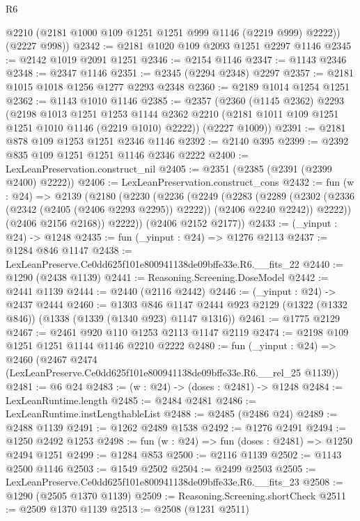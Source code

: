 \begin{lexlean}{R6}
\begin{coremodule}
        @2210
        (@2181 @1000 @109 @1251 @1251 @999 @1146 (@2219 @999) @2222))
      (@2227 @998))
@2342 := @2181 @1020 @109 @2093 @1251 @2297 @1146
@2345 := @2142 @1019 @2091 @1251
@2346 := @2154 @1146
@2347 := @1143 @2346
@2348 := @2347 @1146
@2351 := @2345 (@2294 @2348) @2297
@2357 := @2181 @1015 @1018 @1256 @1277 @2293 @2348
@2360 := @2189 @1014 @1254 @1251
@2362 := @1143 @1010 @1146
@2385 := @2357
    (@2360
      (@1145 @2362)
      @2293
      (@2198
        @1013
        @1251
        @1253
        @1144
        @2362
        @2210
        (@2181 @1011 @109 @1251 @1251 @1010 @1146 (@2219 @1010) @2222))
      (@2227 @1009))
@2391 := @2181 @878 @109 @1253 @1251 @2346 @1146
@2392 := @2140 @395
@2399 := @2392 @835 @109 @1251 @1251 @1146 @2346 @2222
@2400 := LexLeanPreservation.construct_nil
@2405 := @2351 (@2385 (@2391 (@2399 @2400) @2222))
@2406 := LexLeanPreservation.construct_cons
@2432 := fun (w : @24) =>
  @2139
    (@2180
      (@2230
        (@2236
          (@2249
            (@2283
              (@2289
                (@2302 (@2336 (@2342 (@2405 (@2406 @2293 @2295)) @2222)) (@2406 @2240 @2242))
                @2222))
            (@2406 @2156 @2168))
          @2222))
      (@2406 @2152 @2177))
@2433 := (_yinput : @24) -> @1248
@2435 := fun (_yinput : @24) => @1276 @2113
@2437 := @1284 @846 @1147
@2438 := LexLeanPreserve.Ce0dd625f101e800941138de09bffe33e.R6.__fits_22
@2440 := @1290 (@2438 @1139)
@2441 := Reasoning.Screening.DoseModel
@2442 := @2441 @1139
@2444 := @2440 (@2116 @2442)
@2446 := (_yinput : @24) -> @2437 @2444
@2460 := @1303
    @846
    @1147
    @2444
    @923
    @2129
    (@1322 (@1332 @846))
    (@1338 (@1339 (@1340 @923) @1147 @1316))
@2461 := @1775 @2129
@2467 := @2461 @920 @110 @1253 @2113 @1147 @2119
@2474 := @2198 @109 @1251 @1251 @1144 @1146 @2210 @2222
@2480 := fun (_yinput : @24) =>
  @2460 (@2467 @2474 (LexLeanPreserve.Ce0dd625f101e800941138de09bffe33e.R6.__rel_25 @1139))
@2481 := @6 @24
@2483 := (w : @24) -> (doses : @2481) -> @1248
@2484 := LexLeanRuntime.length
@2485 := @2484 @2481
@2486 := LexLeanRuntime.instLengthableList
@2488 := @2485 (@2486 @24)
@2489 := @2488 @1139
@2491 := @1262 @2489 @1538
@2492 := @1276 @2491
@2494 := @1250 @2492 @1253
@2498 := fun (w : @24) => fun (doses : @2481) => @1250 @2494 @1251
@2499 := @1284 @853
@2500 := @2116 @1139
@2502 := @1143 @2500 @1146
@2503 := @1549 @2502
@2504 := @2499 @2503
@2505 := LexLeanPreserve.Ce0dd625f101e800941138de09bffe33e.R6.__fits_23
@2508 := @1290 (@2505 @1370 @1139)
@2509 := Reasoning.Screening.shortCheck
@2511 := @2509 @1370 @1139
@2513 := @2508 (@1231 @2511)

\end{coremodule}
\end{lexlean}
